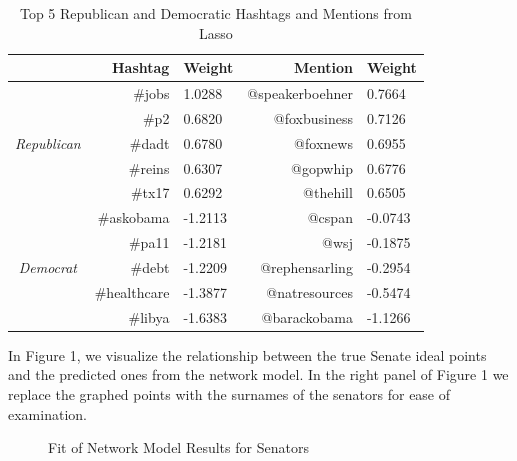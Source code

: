 \documentclass[10pt]{article}
\begin{document}
\begin{table}[!ht]
    \caption{Top 5 Republican and Democratic Hashtags and Mentions from Lasso}
    \centering
    \begin{tabular}{cr|l||r|l}
        & Hashtag & Weight & Mention & Weight \\
        \hline
        \multirow{5}{*}{\emph{Republican}}
        & \#jobs & 1.0288 & @speakerboehner & 0.7664 \\
        & \#p2 & 0.6820 & @foxbusiness & 0.7126 \\
        & \#dadt & 0.6780 & @foxnews & 0.6955 \\
        & \#reins & 0.6307 & @gopwhip & 0.6776 \\
        & \#tx17 & 0.6292 & @thehill & 0.6505 \\
        \hline
        \multirow{5}{*}{\emph{Democrat}}
        & \#askobama & -1.2113 & @cspan & -0.0743 \\
        & \#pa11 & -1.2181 & @wsj & -0.1875 \\
        & \#debt & -1.2209 & @rephensarling & -0.2954 \\
        & \#healthcare & -1.3877 & @natresources & -0.5474 \\
        & \#libya & -1.6383 & @barackobama & -1.1266 \\
        \hline
        \end{tabular}
\end{table}

In Figure 1, we visualize the relationship between the true Senate ideal points and the predicted ones from the network model.  In the right panel of Figure 1 we replace the graphed points with the surnames of the senators for ease of examination.

\begin{figure}[!ht]
    \centering
    \caption{Fit of Network Model Results for Senators}
    \label{fig:senators}
\end{figure}
\end{document}
